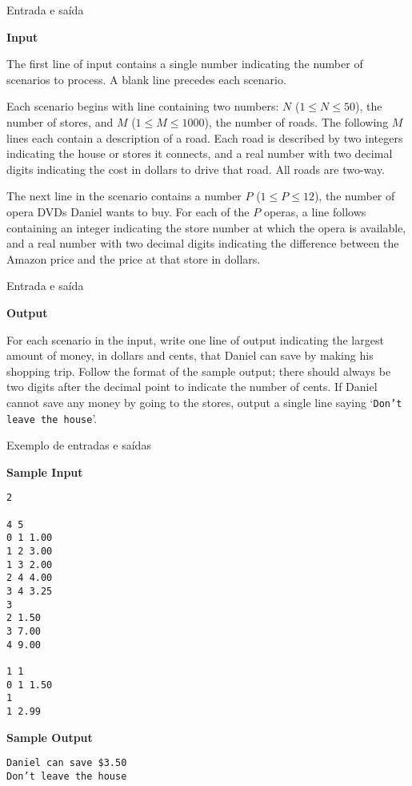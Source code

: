 \begin{frame}[fragile]{Entrada e saída}

\textbf{Input}

The first line of input contains a single number indicating the number of scenarios to process. A 
blank line precedes each scenario.

Each scenario begins with line containing two numbers: $N$ ($1\leq N\leq 50$), the number of 
stores, and $M$ ($1\leq M\leq 1000$), the number of roads. The following $M$ lines each contain a 
description of a road.  Each road is described by two integers indicating the house or stores it 
connects, and a real number with two decimal digits indicating the cost in dollars to drive that 
road. All roads are two-way.

The next line in the scenario contains a number $P$ ($1\leq P\leq 12$), the number of opera DVDs 
Daniel wants to buy. For each of the $P$ operas, a line follows containing an integer indicating 
the store number at which the opera is available, and a real number with two decimal digits 
indicating the difference between the Amazon price and the price at that store in dollars.

\end{frame}

\begin{frame}[fragile]{Entrada e saída}

\textbf{Output}

For each scenario in the input, write one line of output indicating the largest amount of money, in
dollars and cents, that Daniel can save by making his shopping trip. Follow the format of the 
sample output; there should always be two digits after the decimal point to indicate the number of 
cents. If Daniel cannot save any money by going to the stores, output a single line saying 
`\texttt{Don’t leave the house}'.

\end{frame}

\begin{frame}[fragile]{Exemplo de entradas e saídas}

\begin{footnotesize}
\begin{minipage}[t]{0.45\textwidth}
\textbf{Sample Input}
\begin{verbatim}
2

4 5
0 1 1.00
1 2 3.00
1 3 2.00
2 4 4.00
3 4 3.25
3
2 1.50
3 7.00
4 9.00

1 1
0 1 1.50
1
1 2.99
\end{verbatim}
\end{minipage}
\begin{minipage}[t]{0.5\textwidth}
\textbf{Sample Output}
\begin{verbatim}
Daniel can save $3.50
Don’t leave the house
\end{verbatim}
\end{minipage}
\end{footnotesize}
\end{frame}

